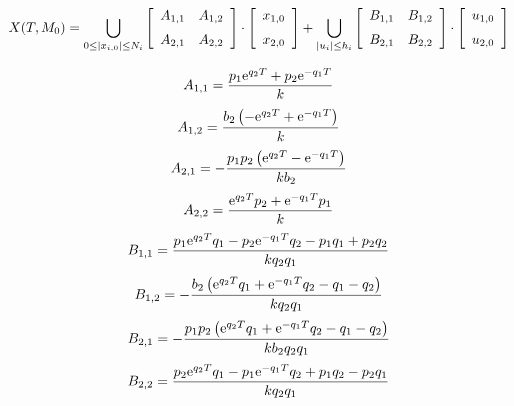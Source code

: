 \documentclass[fontsize=14pt,DIV=1,a4paper]{scrartcl}
\begin{document}
\begin{equation}
X(T, M_0) = 
\bigcup_{0 \leq|x_{i,0}| \leq N_i}
\left[ \begin {array}{cc}
	{A_{1,1}}&{A_{1,2}}\\ \noalign{\medskip}
	{A_{2,1}}&{A_{2,2}}\end {array} \right] \cdot
\left[ \begin {array}{cc}
	{x_{1,0}}\\ \noalign{\medskip}
	{x_{2,0}}\end {array} \right]
+ 
\bigcup_{|u_i| \leq h_i}
\left[ \begin {array}{cc}
	{B_{1,1}}&{B_{1,2}}\\ \noalign{\medskip}
	{B_{2,1}}&{B_{2,2}}\end {array} \right] \cdot
\left[ \begin {array}{cc}
	{u_{1,0}}\\ \noalign{\medskip}
	{u_{2,0}}\end {array} \right]
\end{equation}


\begin{equation}
A_{{1,1}}={\frac {p_{{1}}{{\rm e}^{q_{{2}}T}}+p_{{2}}{{\rm e}
^{-q_{{1}}T}}}{k}}
\end{equation}
\begin{equation}
A_{{1,2}}={\frac {b_{{2}} \left( -{{\rm e}^{q_{{2}}
T}}+{{\rm e}^{-q_{{1}}T}} \right) }{k}}
\end{equation}
\begin{equation}
A_{{2,1}}=-{\frac {p_{{1}}p_{{
2}} \left( {{\rm e}^{q_{{2}}T}}-{{\rm e}^{-q_{{1}}T}} \right) }{kb_{{2
}}}}
\end{equation}
\begin{equation}
A_{{2,2}}={\frac {{{\rm e}^{q_{{2}}T}}p_{{2}}+{{\rm e}^{-q_{{1}}T
}}p_{{1}}}{k}}
\end{equation}
\begin{equation}
B_{{1,1}}={\frac {p_{{1}}{{\rm e}^{q_{{2}}T}}q_{{1}}-p_
{{2}}{{\rm e}^{-q_{{1}}T}}q_{{2}}-p_{{1}}q_{{1}}+p_{{2}}q_{{2}}}{kq_{{
2}}q_{{1}}}}
\end{equation}
\begin{equation}
B_{{1,2}}=-{\frac {b_{{2}} \left( {{\rm e}^{q_{{2}}T}}q_{
{1}}+{{\rm e}^{-q_{{1}}T}}q_{{2}}-q_{{1}}-q_{{2}} \right) }{kq_{{2}}q_
{{1}}}}
\end{equation}
\begin{equation}
B_{{2,1}}=-{\frac {p_{{1}}p_{{2}} \left( {{\rm e}^{q_{{2}}T}}q
_{{1}}+{{\rm e}^{-q_{{1}}T}}q_{{2}}-q_{{1}}-q_{{2}} \right) }{kb_{{2}}
q_{{2}}q_{{1}}}}
\end{equation}
\begin{equation}
B_{{2,2}}={\frac {p_{{2}}{{\rm e}^{q_{{2}}T}}q_{{1}}-
p_{{1}}{{\rm e}^{-q_{{1}}T}}q_{{2}}+p_{{1}}q_{{2}}-p_{{2}}q_{{1}}}{kq_
{{2}}q_{{1}}}}
\end{equation}
\end{document}
